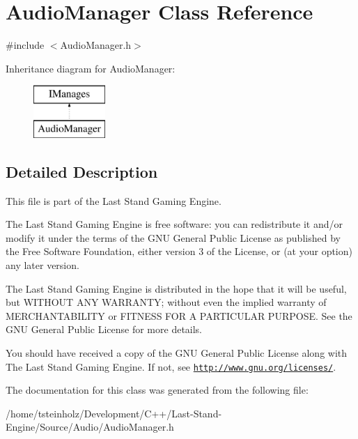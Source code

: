 \hypertarget{classAudioManager}{}\section{Audio\+Manager Class Reference}
\label{classAudioManager}


{\ttfamily \#include $<$Audio\+Manager.\+h$>$}

Inheritance diagram for Audio\+Manager\+:\begin{figure}[H]
\begin{center}
\leavevmode
\includegraphics[height=2.000000cm]{classAudioManager}
\end{center}
\end{figure}


\subsection{Detailed Description}
This file is part of the Last Stand Gaming Engine.

The Last Stand Gaming Engine is free software\+: you can redistribute it and/or modify it under the terms of the G\+N\+U General Public License as published by the Free Software Foundation, either version 3 of the License, or (at your option) any later version.

The Last Stand Gaming Engine is distributed in the hope that it will be useful, but W\+I\+T\+H\+O\+U\+T A\+N\+Y W\+A\+R\+R\+A\+N\+T\+Y; without even the implied warranty of M\+E\+R\+C\+H\+A\+N\+T\+A\+B\+I\+L\+I\+T\+Y or F\+I\+T\+N\+E\+S\+S F\+O\+R A P\+A\+R\+T\+I\+C\+U\+L\+A\+R P\+U\+R\+P\+O\+S\+E. See the G\+N\+U General Public License for more details.

You should have received a copy of the G\+N\+U General Public License along with The Last Stand Gaming Engine. If not, see \href{http://www.gnu.org/licenses/}{\tt http\+://www.\+gnu.\+org/licenses/}. 

The documentation for this class was generated from the following file\+:\begin{DoxyCompactItemize}
\item 
/home/tsteinholz/\+Development/\+C++/\+Last-\/\+Stand-\/\+Engine/\+Source/\+Audio/Audio\+Manager.\+h\end{DoxyCompactItemize}
